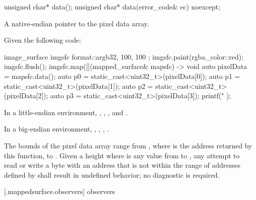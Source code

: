 \begin{itemdecl}
unsigned char* data();
unsigned char* data(error_code& ec) noexcept;
\end{itemdecl}
\begin{itemdescr}
\pnum
\returns
A native-endian pointer to the pixel data array.
\begin{example}
Given the following code:

\begin{codeblock}
image_surface imgsfc{ format::argb32, 100, 100 };
imgsfc.paint(rgba_color::red);
imgsfc.flush();
imgsfc.map([](mapped_surface& mapsfc) -> void {
    auto pixelData = mapsfc.data();
    auto p0 = static_cast<uint32_t>(pixelData[0]);
    auto p1 = static_cast<uint32_t>(pixelData[1]);
    auto p2 = static_cast<uint32_t>(pixelData[2]);
    auto p3 = static_cast<uint32_t>(pixelData[3]);
    printf("%
});
\end{codeblock}

In a little-endian environment, , , , and .

In a big-endian environment, , , , .
\end{example}

\pnum
\remarks
The bounds of the pixel data array range from , where  is the address returned by this function, to . Given a height  where  is any value from  to , any attempt to read or write a byte with an address that is not within the range of addresses defined by  shall result in undefined behavior; no diagnostic is required.
\end{itemdescr}

 [\iotwod.mappedsurface.observers]{ observers}

